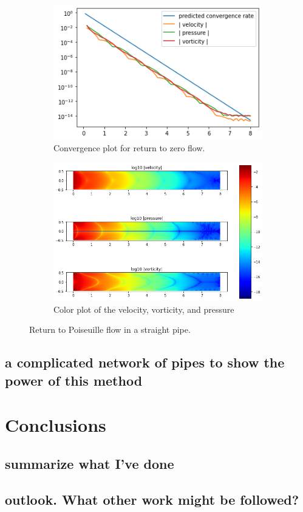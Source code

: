\documentclass[10pt,twocolumn]{article}
\begin{document}
\begin{figure}[h!]
  \centering
  \begin{subfigure}[b]{0.4\textwidth}
    \centering
    \includegraphics[width=\textwidth]{pic/rtp_cv.png}
    \caption{Convergence plot for return to zero flow. }
    \label{fig:rtp_cv}
  \end{subfigure}
  \begin{subfigure}[b]{0.5\textwidth}
    \centering
    \includegraphics[width=\textwidth]{pic/rtppipe.png}
    \caption{Color plot of the velocity, vorticity, and pressure}
    \label{fig:rtppipe}
  \end{subfigure}
  \caption{Return to Poiseuille flow in a straight pipe. }
\end{figure}


\subsection{a complicated network of pipes to show the power of this method}



\section{Conclusions\label{sec:conclusions}}

\subsection{summarize what I've done}
\subsection{outlook. What other work might be followed?}


\end{document}
